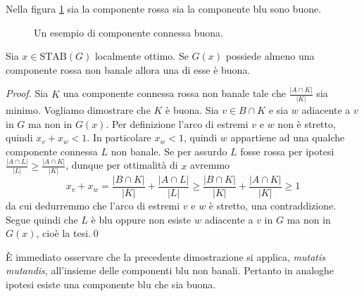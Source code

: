 \begin{example}
	Nella figura \ref{goodexample} sia la componente rossa sia la componente blu sono buone. 
	\begin{figure}
		\centering 
		\caption{Un esempio di componente connessa buona.} \label{goodexample} 
	\end{figure}
\end{example}
\begin{lemma}
	\label{goodlemma} Sia \(x\in \text{STAB}(G)\) localmente ottimo. Se \(G(x)\) possiede almeno una componente rossa non banale allora una di esse è buona. 
\end{lemma}
\begin{proof}
	Sia \(K\) una componente connessa rossa non banale tale che \(\frac{|A\cap K|}{|K|}\) sia minimo. Vogliamo dimostrare che \(K\) è buona. Sia \(v\in B\cap K\) e sia \(w\) adiacente a \(v\) in \(G\) ma non in \(G(x)\). Per definizione l'arco di estremi \(v\) e \(w\) non è stretto, quindi \(x_v+x_w<1\). In particolare \(x_w<1\), quindi \(w\) appartiene ad una qualche componente connessa \(L\) non banale. Se per assurdo \(L\) fosse rossa per ipotesi \(\frac{|A\cap L|}{|L|}\ge\frac{|A\cap K|}{|K|}\), dunque per ottimalità di \(x\) avremmo
	\[x_v+x_w=\frac{|B\cap K|}{|K|}+\frac{|A\cap L|}{|L|}\ge\frac{|B\cap K|}{|K|}+\frac{|A\cap K|}{|K|}\ge 1\]
	da cui dedurremmo che l'arco di estremi \(v\) e \(w\) è stretto, una contraddizione. Segue quindi che \(L\) è blu oppure non esiste \(w\) adiacente a \(v\) in \(G\) ma non in \(G(x)\), cioè la tesi.\qed 
\end{proof}
È immediato osservare che la precedente dimostrazione si applica, \emph{mutatis mutandis}, all'insieme delle componenti blu non banali. Pertanto in analoghe ipotesi esiste una componente blu che sia buona. 
